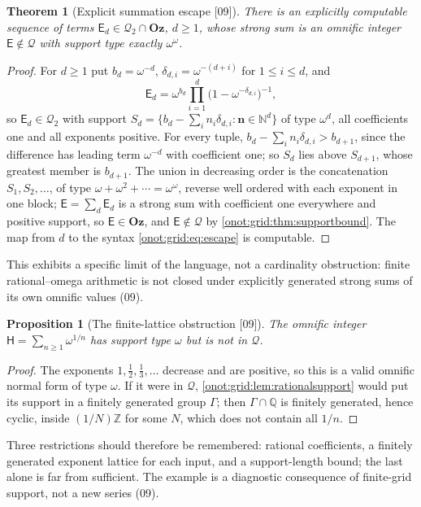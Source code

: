 \documentclass[11pt,oneside]{article}
\numberwithin{equation}{section}
\newtheorem{theorem}{Theorem}[section]
\newtheorem{proposition}[proposition]{Proposition}
\theoremstyle{definition}
\theoremstyle{remark}
\newcommand{\Oz}{\mathbf{Oz}}
\newcommand{\N}{\mathbb N}
\newcommand{\Z}{\mathbb Z}
\newcommand{\Q}{\mathbb Q}
\newcommand{\QO}{\mathcal Q}
\newcommand{\src}[1]{\textup{\textsf{\small[#1]}}}
\begin{document}
\begin{theorem}[Explicit summation escape \src{09}]\label{onot:grid:thm:escape}
There is an explicitly computable sequence of terms $\mathsf E_d\in\QO_2\cap\Oz$,
$d\ge1$, whose strong sum is an omnific integer $\mathsf E\notin\QO$ with support
type exactly $\omega^\omega$.
\end{theorem}
\begin{proof}
For $d\ge1$ put $b_d=\omega^{-d}$, $\delta_{d,i}=\omega^{-(d+i)}$ for $1\le i\le d$,
and
\begin{equation}\label{onot:grid:eq:escape}
 \mathsf E_d=\omega^{b_d}\prod_{i=1}^d\bigl(1-\omega^{-\delta_{d,i}}\bigr)^{-1},
\end{equation}
so $\mathsf E_d\in\QO_2$ with support
$S_d=\{b_d-\sum_in_i\delta_{d,i}:\mathbf n\in\N^d\}$ of type $\omega^d$, all
coefficients one and all exponents positive. For every tuple,
$b_d-\sum_in_i\delta_{d,i}>b_{d+1}$, since the difference has leading term
$\omega^{-d}$ with coefficient one; so $S_d$ lies above $S_{d+1}$, whose greatest
member is $b_{d+1}$. The union in decreasing order is the concatenation
$S_1,S_2,\ldots$, of type $\omega+\omega^2+\cdots=\omega^\omega$, reverse well
ordered with each exponent in one block; $\mathsf E=\sum_d\mathsf E_d$ is a strong
sum with coefficient one everywhere and positive support, so $\mathsf E\in\Oz$, and
$\mathsf E\notin\QO$ by \cref{onot:grid:thm:supportbound}. The map from $d$ to the
syntax \eqref{onot:grid:eq:escape} is computable.
\end{proof}
This exhibits a specific limit of the language, not a cardinality obstruction:
finite rational--omega arithmetic is not closed under explicitly generated strong
sums of its own omnific values (09).

\begin{proposition}[The finite-lattice obstruction \src{09}]\label{onot:grid:prop:denominators}
The omnific integer $\mathsf H=\sum_{n\ge1}\omega^{1/n}$ has support type
$\omega$ but is not in $\QO$.
\end{proposition}
\begin{proof}
The exponents $1,\tfrac12,\tfrac13,\ldots$ decrease and are positive, so this is a
valid omnific normal form of type $\omega$. If it were in $\QO$,
\cref{onot:grid:lem:rationalsupport} would put its support in a finitely generated
group $\Gamma$; then $\Gamma\cap\Q$ is finitely generated, hence cyclic, inside
$(1/N)\Z$ for some $N$, which does not contain all $1/n$.
\end{proof}
Three restrictions should therefore be remembered: rational coefficients, a
finitely generated exponent lattice for each input, and a support-length bound;
the last alone is far from sufficient. The example is a diagnostic consequence of
finite-grid support, not a new series (09).
\end{document}
